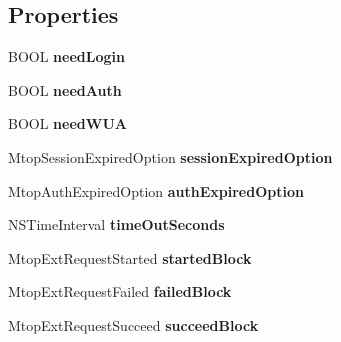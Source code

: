 \subsection*{Properties}
\begin{DoxyCompactItemize}
\item 
\mbox{\label{interface_mtop_ext_request_a22a86df0e1fabd60f25a06524bb3a140}} 
B\+O\+OL {\bfseries need\+Login}
\item 
\mbox{\label{interface_mtop_ext_request_a02aaf3d26d56e4d31bb32d34a2754d82}} 
B\+O\+OL {\bfseries need\+Auth}
\item 
\mbox{\label{interface_mtop_ext_request_a56bb442d9b8b1840fccaab587f8f2b75}} 
B\+O\+OL {\bfseries need\+W\+UA}
\item 
\mbox{\label{interface_mtop_ext_request_a4f514ab537399f4486acf7928b0b7a68}} 
Mtop\+Session\+Expired\+Option {\bfseries session\+Expired\+Option}
\item 
\mbox{\label{interface_mtop_ext_request_a26ad14920503d629d325a9b23bf336e5}} 
Mtop\+Auth\+Expired\+Option {\bfseries auth\+Expired\+Option}
\item 
\mbox{\label{interface_mtop_ext_request_a4f08c4ecc0e8188d9ce45d83e14259ff}} 
N\+S\+Time\+Interval {\bfseries time\+Out\+Seconds}
\item 
\mbox{\label{interface_mtop_ext_request_af737d57d83e3a8b63ec231261bb7a94c}} 
Mtop\+Ext\+Request\+Started {\bfseries started\+Block}
\item 
\mbox{\label{interface_mtop_ext_request_a7d961dfb0eab2bb779d11991eb61bb6d}} 
Mtop\+Ext\+Request\+Failed {\bfseries failed\+Block}
\item 
\mbox{\label{interface_mtop_ext_request_ae15a2086b5e1d44542ce5bb054b896dd}} 
Mtop\+Ext\+Request\+Succeed {\bfseries succeed\+Block}
\item 
\mbox{\label{interface_mtop_ext_request_a9d728c9fb4fd1ed064a24928b18e2c78}} 

\end{DoxyCompactItemize}
